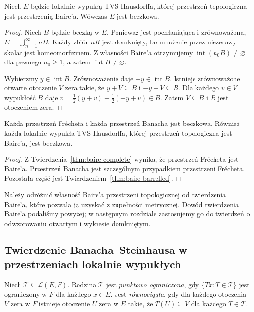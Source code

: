 \begin{twierdzenie}\label{thm:baire-barrelled}
Niech $E$ będzie lokalnie wypukłą TVS Hausdorffa, której
przestrzeń topologiczna jest przestrzenią Baire'a.
Wówczas $E$ jest beczkowa.
\end{twierdzenie}
\begin{proof}
Niech $B$ będzie beczką w $E$. Ponieważ jest pochłaniająca
i zrównoważona, $E=\bigcup_{n=1}^\infty nB$. Każdy zbiór
$nB$ jest domknięty, bo mnożenie przez niezerowy skalar
jest homeomorfizmem. Z własności Baire'a otrzymujemy
$\operatorname{int}(n_0B)\ne\varnothing$ dla pewnego
$n_0\ge1$, a zatem $\operatorname{int}B\ne\varnothing$.

Wybierzmy $y\in\operatorname{int}B$. Zrównoważenie daje
$-y\in\operatorname{int}B$. Istnieje zrównoważone
otwarte otoczenie $V$ zera takie, że
$y+V\subseteq B$ i $-y+V\subseteq B$. Dla każdego
$v\in V$ wypukłość $B$ daje
$v=\frac12(y+v)+\frac12(-y+v)\in B$.
Zatem $V\subseteq B$ i $B$ jest otoczeniem zera.
\end{proof}

\begin{wniosek}\label{cor:frechet-barrelled}
Każda przestrzeń Frécheta i każda przestrzeń Banacha
jest beczkowa. Również każda lokalnie wypukła TVS
Hausdorffa, której przestrzeń topologiczna jest Baire'a,
jest beczkowa.
\end{wniosek}
\begin{proof}
Z Twierdzenia~\ref{thm:baire-complete} wynika, że
przestrzeń Frécheta jest Baire'a.
Przestrzeń Banacha jest szczególnym przypadkiem przestrzeni
Frécheta. Pozostała część jest
Twierdzeniem~\ref{thm:baire-barrelled}.
\end{proof}

\begin{uwaga}
Należy odróżnić własność Baire'a przestrzeni topologicznej
od twierdzenia Baire'a, które pozwala ją uzyskać z
zupełności metrycznej. Dowód twierdzenia Baire'a podaliśmy powyżej;
w następnym rozdziale zastosujemy go do twierdzeń
o odwzorowaniu otwartym i wykresie domkniętym.
\end{uwaga}

\subsection{Twierdzenie Banacha--Steinhausa w przestrzeniach lokalnie wypukłych}

\begin{definicja}
Niech $\mathcal T\subseteq\mathcal L(E,F)$.
Rodzina $\mathcal T$ jest \emph{punktowo ograniczona}, gdy
$\{Tx:T\in\mathcal T\}$ jest ograniczony w $F$ dla każdego
$x\in E$. Jest \emph{równociągła}, gdy dla każdego otoczenia
$V$ zera w $F$ istnieje otoczenie $U$ zera w $E$
takie, że $T(U)\subseteq V$ dla każdego $T\in\mathcal T$.
\end{definicja}

